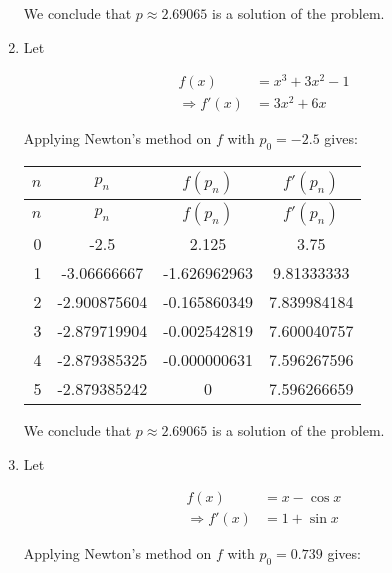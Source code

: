 \documentclass[../../../../Assignments]{subfiles}
\begin{document}
\begin{solution}
\begin{enumerate}[label = \alph*)]
            We conclude that \(p \approx \num{2.69065}\) is a solution of the
            problem.

        \item Let

            \begin{align*}
                             f(x) &= x^3 + 3x^2 - 1 \\
                \Rightarrow f'(x) &= 3x^2 + 6x
            \end{align*}

            Applying Newton's method on \(f\) with \(p_0 = \num{-2.5}\) gives:

            \begin{longtable}{r S[table-format=-1.9] S[table-format=-1.9] S[table-format=2.9]}
                \toprule
                \(n\)  &    {\(p_n\)}   &  {\(f(p_n)\)}  &  {\(f'(p_n)\)}  \\
                \midrule
                \endfirsthead
                \(n\)  &    {\(p_n\)}   &  {\(f(p_n)\)}  &  {\(f'(p_n)\)}  \\
                \midrule
                  &  -2.5          &   2.125        &  3.75           \\
                    1  &  -3.06666667   &  -1.626962963  &  9.81333333     \\
                    2  &  -2.900875604  &  -0.165860349  &  7.839984184    \\
                    3  &  -2.879719904  &  -0.002542819  &  7.600040757    \\
                    4  &  -2.879385325  &  -0.000000631  &  7.596267596    \\
                    5  &  -2.879385242  &   0            &  7.596266659    \\
                \bottomrule
            \end{longtable}

            We conclude that \(p \approx \num{2.69065}\) is a solution of the
            problem.

        \item Let

            \begin{align*}
                             f(x) &= x - \cos{x} \\
                \Rightarrow f'(x) &= 1 + \sin{x}
            \end{align*}

            Applying Newton's method on \(f\) with \(p_0 = \num{0.739}\) gives:


\end{enumerate}
\end{solution}
\end{document}
